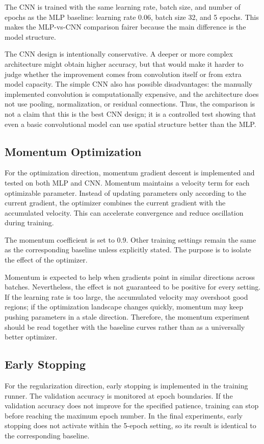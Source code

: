 \documentclass[10pt,twocolumn]{article}
\begin{document}
The CNN is trained with the same learning rate, batch size, and number of epochs as the MLP baseline: learning rate 0.06, batch size 32, and 5 epochs. This makes the MLP-vs-CNN comparison fairer because the main difference is the model structure.

The CNN design is intentionally conservative. A deeper or more complex architecture might obtain higher accuracy, but that would make it harder to judge whether the improvement comes from convolution itself or from extra model capacity. The simple CNN also has possible disadvantages: the manually implemented convolution is computationally expensive, and the architecture does not use pooling, normalization, or residual connections. Thus, the comparison is not a claim that this is the best CNN design; it is a controlled test showing that even a basic convolutional model can use spatial structure better than the MLP.

\subsection{Momentum Optimization}
For the optimization direction, momentum gradient descent is implemented and tested on both MLP and CNN. Momentum maintains a velocity term for each optimizable parameter. Instead of updating parameters only according to the current gradient, the optimizer combines the current gradient with the accumulated velocity. This can accelerate convergence and reduce oscillation during training.

The momentum coefficient is set to 0.9. Other training settings remain the same as the corresponding baseline unless explicitly stated. The purpose is to isolate the effect of the optimizer.

Momentum is expected to help when gradients point in similar directions across batches. Nevertheless, the effect is not guaranteed to be positive for every setting. If the learning rate is too large, the accumulated velocity may overshoot good regions; if the optimization landscape changes quickly, momentum may keep pushing parameters in a stale direction. Therefore, the momentum experiment should be read together with the baseline curves rather than as a universally better optimizer.

\subsection{Early Stopping}
For the regularization direction, early stopping is implemented in the training runner. The validation accuracy is monitored at epoch boundaries. If the validation accuracy does not improve for the specified patience, training can stop before reaching the maximum epoch number. In the final experiments, early stopping does not activate within the 5-epoch setting, so its result is identical to the corresponding baseline.
\end{document}
